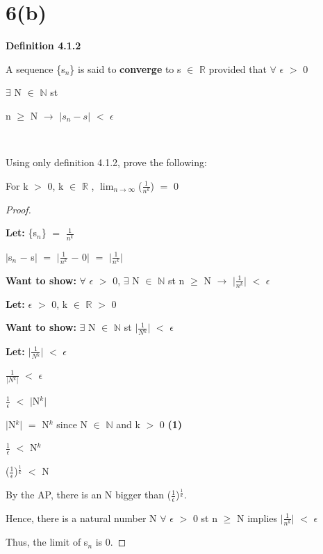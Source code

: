 \documentclass{article}
\newcommand{\mt}[1]{\ensuremath{#1}}
\newcommand\bsc[2][\DefaultOpt]{%
  \def\DefaultOpt{#2}%
  \section[#1]{#2}%
}
\newcommand{\bgpf}{\begin{proof} $ $\newline}
\newcommand{\lt}[1]{\textbf{Let: } #1}
\newcommand{\wts}[1]{\textbf{Want to show: } #1}
\newcommand{\bpth}[1]{\textbf{(#1)}}
\newcommand{\epf}{\end{proof}}
\newcommand{\br}{\mt{\mathbb{R}} }       %
\newcommand{\bn}{\mt{\mathbb{N}} }       %
\newcommand{\ep}{\mt{\epsilon} }         %
\newcommand{\fa}{\mt{\forall} }          %
\newcommand{\mem}{\mt{\in} }
\newcommand{\exs}{\mt{\exists} }
\newcommand{\lra}{ \mt{\longrightarrow} } %
\newcommand{\av}[1]{\mt{|}#1\mt{|}}  %
\newcommand{\prn}[1]{(#1)}
\newcommand{\bk}[1]{\{#1\}}
\newcommand{\ms}{\mt{-} }
\newcommand{\ls}{\mt{<} }
\newcommand{\gr}{\mt{>} }
\newcommand{\gre}{\mt{\geq} }
\newcommand{\eql}{\mt{=} }
\newcommand{\uw}[2]{#1\mt{_{#2}}}
\newcommand{\uf}[2]{#1\mt{^{#2}}}
\newcommand{\frc}[2]{\mt{\frac{#1}{#2}}}
\newcommand{\lmti}[1]{\mt{\displaystyle{\lim_{#1 \to \infty}}}}
\begin{document}
\bsc{6(b)}{

\textbf{Definition 4.1.2}

A sequence \{\uw{s}{n}\} is said to \textbf{converge} to s \mem \br provided that \fa \ep $>$ 0

\exs N \mem \bn st

n \gre N \lra $|\uw{s}{n} - s|$ $<$ \ep \textrm{   } \

\

Using only definition 4.1.2, prove the following:

For k $>$ 0, k \mem \br, \lmti{n}(\frc{1}{\uf{n}{k}}) \eql 0

\bgpf

\lt{ \bk{\uw{s}{n}} \eql \frc{1}{\mt{n^k}}}

\av{\uw{s}{n} \ms s} \eql \av{\frc{1}{\mt{n^k}} \ms 0} \eql \av{\frc{1}{\uf{n}{k}}}

\wts{\fa \ep \gr 0, \exs N \mem \bn st n \gre N \lra \av{\frc{1}{\uf{n}{k}}} \ls \ep}

\lt{\ep \gr 0, k \mem \br \gr 0}

\wts{\exs N \mem \bn st \av{\frc{1}{\uf{N}{k}}} \ls \ep}

\lt{\av{\frc{1}{\uf{N}{k}}} \ls \ep}

\frc{1}{\av{\uf{N}{k}}} \ls \ep

\frc{1}{\ep} \ls \av{\uf{N}{k}} \

\av{\uf{N}{k}} \eql \uf{N}{k} since N \mem \bn and k \gr 0 \bpth{1}

\frc{1}{\ep} \ls \uf{N}{k}

\uf{\prn{\frc{1}{\ep}}}{\frc{1}{k}} \ls N

By the AP, there is an N bigger than \uf{\prn{\frc{1}{\ep}}}{\frc{1}{k}}.

Hence, there is a natural number N \fa \ep \gr 0 st n \gre N implies \av{\frc{1}{\uf{n}{k}}} \ls \ep

Thus, the limit of \uw{s}{n} is 0.

\epf

}

\newpage
\end{document}
